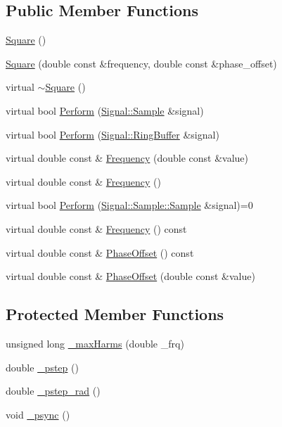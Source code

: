 \subsection*{Public Member Functions}
\begin{DoxyCompactItemize}
\item 
\hyperlink{classDSG_1_1Fourier_1_1Square_a6c2dace99169590ee6f38c1ccadc3e55}{Square} ()
\item 
\hyperlink{classDSG_1_1Fourier_1_1Square_aaf021d1858fa5718f2c0a24fd314a642}{Square} (double const \&frequency, double const \&phase\-\_\-offset)
\item 
virtual \hyperlink{classDSG_1_1Fourier_1_1Square_a20e4a5daf1b47ac185492ed95f969ec6}{$\sim$\-Square} ()
\item 
virtual bool \hyperlink{classDSG_1_1Fourier_1_1Square_a876ecc851955e27730f7d324f87aaf97}{Perform} (\hyperlink{classDSG_1_1Signal_1_1Sample}{Signal\-::\-Sample} \&signal)
\item 
virtual bool \hyperlink{classDSG_1_1Fourier_1_1Square_a85bc3a635cd2643122938c6c06d99ae1}{Perform} (\hyperlink{classDSG_1_1Signal_1_1RingBuffer}{Signal\-::\-Ring\-Buffer} \&signal)
\item 
virtual double const \& \hyperlink{classDSG_1_1Fourier_1_1Square_ad884a0f68014fb110d839c948272e5ea}{Frequency} (double const \&value)
\item 
virtual double const \& \hyperlink{classDSG_1_1Fourier_1_1Square_a721fcf8e4e85ed6fc572b716683e8327}{Frequency} ()
\item 
virtual bool \hyperlink{classDSG_1_1SignalProcess_ae8a803d175eca1ec5f34a52035a082b4}{Perform} (\hyperlink{classDSG_1_1Signal_1_1Sample_a21db6fade3ee3554ed3887cb2b74daff}{Signal\-::\-Sample\-::\-Sample} \&signal)=0
\item 
virtual double const \& \hyperlink{classDSG_1_1SignalGenerator_aedac746c5a70818d120858542ecb7c45}{Frequency} () const 
\item 
virtual double const \& \hyperlink{classDSG_1_1SignalGenerator_a1ce521847edd0b837fd840998f906b4b}{Phase\-Offset} () const 
\item 
virtual double const \& \hyperlink{classDSG_1_1SignalGenerator_a08b71b1f30ba65e629642c570291dc0e}{Phase\-Offset} (double const \&value)
\end{DoxyCompactItemize}
\subsection*{Protected Member Functions}
\begin{DoxyCompactItemize}
\item 
unsigned long \hyperlink{classDSG_1_1Fourier_1_1FourierGenerator_a38d0cc3f7f26e89379626627c17ae33a}{\-\_\-max\-Harms} (double \-\_\-frq)
\item 
double \hyperlink{classDSG_1_1SignalGenerator_ac0d781b8673b3a283bf7c133290ede50}{\-\_\-pstep} ()
\item 
double \hyperlink{classDSG_1_1SignalGenerator_ae660eb4caa88b8d278f8d24d0908a487}{\-\_\-pstep\-\_\-rad} ()
\item 
void \hyperlink{classDSG_1_1SignalGenerator_a05baccb38d1e52860d4fcf7cb8430efc}{\-\_\-psync} ()
\end{DoxyCompactItemize}
